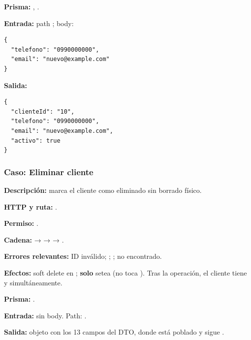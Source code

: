 \textbf{Prisma:} \texttt{}, \texttt{}.


\textbf{Entrada:} path \texttt{}; body:


\begin{lstlisting}
{
  "telefono": "0990000000",
  "email": "nuevo@example.com"
}
\end{lstlisting}


\textbf{Salida:}


\begin{lstlisting}
{
  "clienteId": "10",
  "telefono": "0990000000",
  "email": "nuevo@example.com",
  "activo": true
}
\end{lstlisting}


\subsubsection{Caso: Eliminar cliente}


\textbf{Descripción:} marca el cliente como eliminado sin borrado físico.


\textbf{HTTP y ruta:} \texttt{}.


\textbf{Permiso:} \texttt{}.


\textbf{Cadena:} \texttt{} → \texttt{} → \texttt{} → \texttt{}.


\textbf{Errores relevantes:} \texttt{} ID inválido; \texttt{}; \texttt{}; \texttt{} no encontrado.


\textbf{Efectos:} soft delete en \texttt{}; \textbf{solo} setea \texttt{} (no toca \texttt{}). Tras la operación, el cliente tiene \texttt{} y \texttt{} simultáneamente.


\textbf{Prisma:} \texttt{}.


\textbf{Entrada:} sin body. Path: \texttt{}.


\textbf{Salida:} objeto \texttt{} con los 13 campos del DTO, donde \texttt{} está poblado y \texttt{} sigue \texttt{}.



